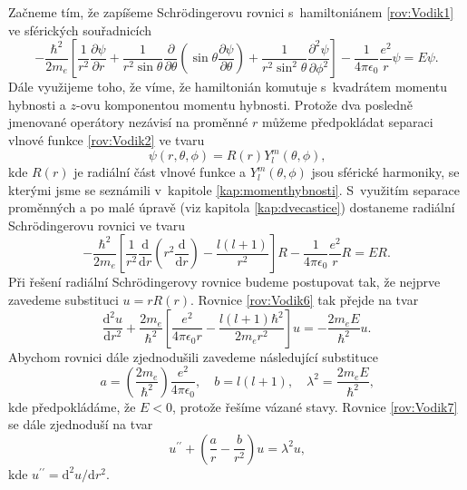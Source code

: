 Začneme tím, že zapíšeme Schrödingerovu rovnici s~hamiltoniánem \eqref{rov:Vodik1} ve sférických souřadnicích
\begin{equation}
-\frac{\hbar^2}{2m_e} \left[ \frac{1}{r^2}\frac{\partial \psi}{\partial r} + \frac{1}{r^2 \sin \theta}\frac{\partial}{\partial \theta} \left( \sin \theta \frac{\partial \psi}{\partial \theta} \right) + \frac{1}{r^2 \sin^2 \theta}\frac{\partial^2 \psi}{\partial \phi^2}\right] - \frac{1}{4 \pi \epsilon_0}\frac{e^2}{r}\psi = E \psi \mbox{.}
\label{rov:Vodik4}
\end{equation}
Dále využijeme toho, že víme, že hamiltonián komutuje s~kvadrátem momentu hybnosti a $z$-ovu komponentou momentu hybnosti. Protože dva posledně jmenované operátory nezávisí na proměnné $r$ můžeme předpokládat separaci vlnové funkce \eqref{rov:Vodik2} ve tvaru
\begin{equation}
\psi(r, \theta, \phi) = R(r)Y_l^m(\theta, \phi) \mbox{,}
\label{rov:Vodik5}
\end{equation}
kde $R(r)$ je radiální část vlnové funkce a $Y_l^m(\theta, \phi)$ jsou sférické harmoniky, se kterými jsme se seznámili v~kapitole \ref{kap:momenthybnosti}. S~využitím separace proměnných a po malé úpravě (viz kapitola \ref{kap:dvecastice}) dostaneme radiální Schrödingerovu rovnici ve tvaru
\begin{equation}
-\frac{\hbar^2}{2m_e} \left[ \frac{1}{r^2}\frac{\mathrm{d}}{\mathrm{d} r} \left( r^2  \frac{\mathrm{d}}{\mathrm{d}r} \right) - \frac{l(l+1)}{r^2}\right]R - \frac{1}{4 \pi \epsilon_0}\frac{e^2}{r}R = E R \mbox{.}
\label{rov:Vodik6}
\end{equation}
Při řešení radiální Schrödingerovy rovnice budeme postupovat tak, že nejprve zavedeme substituci $u=rR(r)$. Rovnice \eqref{rov:Vodik6} tak přejde na tvar
\begin{equation}
\frac{\mathrm{d}^2 u}{\mathrm{d}r^2}+ \frac{2m_e}{\hbar^2}\left[ \frac{e^2}{4 \pi \epsilon_0 r} - \frac{l(l+1)\hbar^2}{2 m_e r^2}\right]u = -\frac{2m_e E}{\hbar^2}u \mbox{.}
\label{rov:Vodik7}
\end{equation} 
Abychom rovnici dále zjednodušili zavedeme následující substituce
\begin{equation}
a = \left(\frac{2m_e}{\hbar^2} \right) \frac{e^2}{4\pi \epsilon_0}, \quad b=l(l+1), \quad \lambda^2 = \frac{2 m_e E}{\hbar^2} \mbox{,}
\label{rov:Vodik8}
\end{equation}
kde předpokládáme, že $E<0$, protože řešíme vázané stavy. Rovnice \eqref{rov:Vodik7} se dále zjednoduší na tvar
\begin{equation}
u^{\prime\prime} + \left( \frac{a}{r} - \frac{b}{r^2} \right) u = \lambda^2 u \mbox{,}
\label{rov:Vodik9}
\end{equation}
kde $u^{\prime\prime} = \mathrm{d}^2u/\mathrm{d}r^2$.

